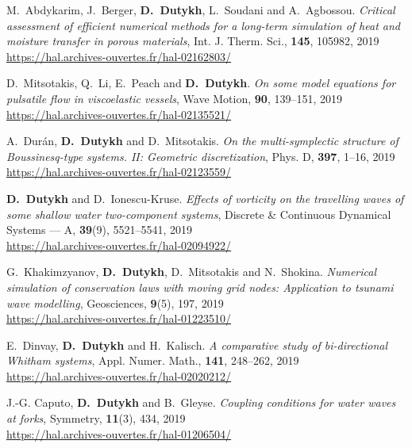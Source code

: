 \begin{etaremune}
  \item M.~Abdykarim, J.~Berger, \textbf{D.~Dutykh}, L.~Soudani and A.~Agbossou. \textit{Critical assessment of efficient numerical methods for a long-term simulation of heat and moisture transfer in porous materials}, Int. J. Therm. Sci., \textbf{145}, 105982, 2019 \\ %
  \url{https://hal.archives-ouvertes.fr/hal-02162803/}
  
  \item D.~Mitsotakis, Q.~Li, E.~Peach and \textbf{D.~Dutykh}. \textit{On some model equations for pulsatile flow in viscoelastic vessels}, Wave Motion, \textbf{90}, 139--151, 2019 \\ %
  \url{https://hal.archives-ouvertes.fr/hal-02135521/}
  
  \item A.~Dur\'{a}n, \textbf{D.~Dutykh} and D.~Mitsotakis. \textit{On the multi-symplectic structure of Boussinesq-type systems. II: Geometric discretization}, Phys. D, \textbf{397}, 1--16, 2019 \\ %
  \url{https://hal.archives-ouvertes.fr/hal-02123559/}
  
  \item \textbf{D.~Dutykh} and D.~Ionescu-Kruse. \textit{Effects of vorticity on the travelling waves of some shallow water two-component systems}, Discrete \& Continuous Dynamical Systems --- A, \textbf{39}(9), 5521--5541, 2019 \\ %
  \url{https://hal.archives-ouvertes.fr/hal-02094922/}
  
  \item G.~Khakimzyanov, \textbf{D.~Dutykh}, D.~Mitsotakis and N.~Shokina. \textit{Numerical simulation of conservation laws with moving grid nodes: Application to tsunami wave modelling}, Geosciences, \textbf{9}(5), 197, 2019 \\ %
  \url{https://hal.archives-ouvertes.fr/hal-01223510/}

  \item E.~Dinvay, \textbf{D.~Dutykh} and H.~Kalisch. \textit{A comparative study of bi-directional Whitham systems}, Appl. Numer. Math., \textbf{141}, 248--262, 2019 \\ %
  \url{https://hal.archives-ouvertes.fr/hal-02020212/}
  
  \item J.-G. Caputo, \textbf{D.~Dutykh} and B.~Gleyse. \textit{Coupling conditions for water waves at forks}, Symmetry, \textbf{11}(3), 434, 2019 \\ %
  \url{https://hal.archives-ouvertes.fr/hal-01206504/}
  

\end{etaremune}
